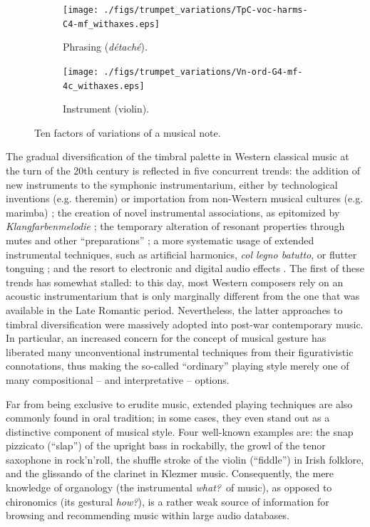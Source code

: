 \documentclass{article}
\makeatletter
\newcommand*{\eg}{e.g.\@\xspace}
\makeatother
\begin{document}
\begin{figure}
        \begin{subfigure}[b]{0.25\textwidth}
                \centering
                \texttt{[image: ./figs/trumpet\_variations/TpC-voc-harms-C4-mf\_withaxes.eps]}
                \caption{Phrasing (\emph{d\'{e}tach\'{e}}).}
                \label{fig:TpC+voc-harms-G4-mf_withaxes}
        \end{subfigure}%
        \begin{subfigure}[b]{0.25\textwidth}
                \centering
                \texttt{[image: ./figs/trumpet\_variations/Vn-ord-G4-mf-4c\_withaxes.eps]}
                \caption{Instrument (violin).}
                \label{fig:Vn-ord-G4-mf-4c}
        \end{subfigure}
        \caption{Ten factors of variations of a musical note.}\label{fig:trumpet-variations}
\end{figure}

The gradual diversification of the timbral palette in Western classical music at the turn of the 20th century is reflected in five concurrent trends:
the addition of new instruments to the symphonic instrumentarium, either by technological inventions (\eg theremin) or importation from non-Western musical cultures (\eg marimba) \cite{sachs2012book};
the creation of novel instrumental associations, as epitomized by \emph{Klangfarbenmelodie} \cite{schoenberg2010book};
the temporary alteration of resonant properties through mutes and other ``preparations'' \cite{dianova2007phd};
a more systematic usage of extended instrumental techniques, such as artificial harmonics, \emph{col legno batutto}, or flutter tonguing \cite{kostka2016book};
and the resort to electronic and digital audio effects \cite{zolzer2011dafx}.
The first of these trends has somewhat stalled: to this day, most Western composers rely on an acoustic instrumentarium that is only marginally different from the one that was available in the Late Romantic period.
Nevertheless, the latter approaches to timbral diversification were massively adopted into post-war contemporary music.
In particular, an increased concern for the concept of musical gesture \cite{godoy2009book} has liberated many unconventional instrumental techniques from their figurativistic connotations, thus making the so-called ``ordinary'' playing style merely one of many compositional -- and interpretative -- options.

Far from being exclusive to erudite music, extended playing techniques are also commonly found in oral tradition; in some cases, they even stand out as a distinctive component of musical style.
Four well-known examples are:
the snap pizzicato (``slap'') of the upright bass in rockabilly,
the growl of the tenor saxophone in rock'n'roll,
the shuffle stroke of the violin (``fiddle'') in Irish folklore,
and the glissando of the clarinet in Klezmer music.
Consequently, the mere knowledge of organology (the instrumental \emph{what?}~of music), as opposed to chironomics (its gestural \emph{how?}), is a rather weak source of information for browsing and recommending music within large audio databases.
\end{document}
